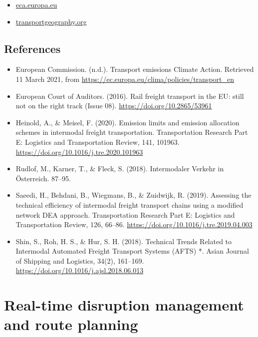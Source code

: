 \documentclass[
]{book}
\providecommand{\tightlist}{%
  \setlength{\itemsep}{0pt}\setlength{\parskip}{0pt}}
\begin{document}
\begin{itemize}
\tightlist
\item
  \href{https://www.eca.europa.eu/en/Pages/DocItem.aspx?did=36398}{eca.europa.eu}
\item
  \href{https://transportgeography.org/contents/chapter5/intermodal-transportation-containerization/}{transportgeography.org}
\end{itemize}

\hypertarget{references-22}{%
\subsection*{References}\label{references-22}}

\begin{itemize}
\tightlist
\item
  European Commission. (n.d.). Transport emissions \textbar{} Climate Action. Retrieved 11 March 2021, from \url{https://ec.europa.eu/clima/policies/transport_en}
\item
  European Court of Auditors. (2016). Rail freight transport in the EU: still not on the right track (Issue 08). \url{https://doi.org/10.2865/53961}
\item
  Heinold, A., \& Meisel, F. (2020). Emission limits and emission allocation schemes in intermodal freight transportation. Transportation Research Part E: Logistics and Transportation Review, 141, 101963. \url{https://doi.org/10.1016/j.tre.2020.101963}
\item
  Rudlof, M., Karner, T., \& Fleck, S. (2018). Intermodaler Verkehr in Österreich. 87--95.
\item
  Saeedi, H., Behdani, B., Wiegmans, B., \& Zuidwijk, R. (2019). Assessing the technical efficiency of intermodal freight transport chains using a modified network DEA approach. Transportation Research Part E: Logistics and Transportation Review, 126, 66--86. \url{https://doi.org/10.1016/j.tre.2019.04.003}
\item
  Shin, S., Roh, H. S., \& Hur, S. H. (2018). Technical Trends Related to Intermodal Automated Freight Transport Systems (AFTS) *. Asian Journal of Shipping and Logistics, 34(2), 161--169. \url{https://doi.org/10.1016/j.ajsl.2018.06.013}
\end{itemize}

\hypertarget{disruption_management}{%
\section{Real-time disruption management and route planning}\label{disruption_management}}
\end{document}
